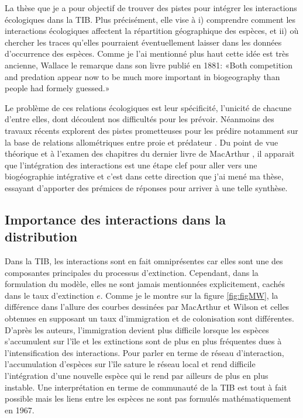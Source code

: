 La thèse que je a pour objectif de trouver des pistes pour intégrer les
interactions écologiques dans la TIB. Plus précisément, elle vise à i)
comprendre comment les interactions écologiques affectent la répartition
géographique des espèces, et ii) où chercher les traces qu'elles
pourraient éventuellement laisser dans les données d'occurrence des
espèces. Comme je l'ai mentionné plus haut cette idée est très ancienne,
Wallace le remarque dans son livre publié en 1881: «Both competition and
predation appear now to be much more important in biogeography than
people had formely guessed.»

Le problème de ces relations écologiques est leur spécificité, l'unicité
de chacune d'entre elles, dont découlent nos difficultés pour les
prévoir. Néanmoins des travaux récents explorent des pistes prometteuses
pour les prédire notamment sur la base de relations allométriques entre
proie et prédateur \citep{Gravel2013}. Du point de vue théorique et à
l'examen des chapitres du dernier livre de MacArthur
\citep{macarthur1972geographical}, il apparait que l'intégration des
interactions est une étape clef pour aller vers une biogéographie
intégrative et c'est dans cette direction que j'ai mené ma thèse,
essayant d'apporter des prémices de réponses pour arriver à une telle
synthèse.

\subsection*{Importance des interactions dans la
distribution}\label{importance-des-interactions-dans-la-distribution}

Dans la TIB, les interactions sont en fait omniprésentes car elles sont
une des composantes principales du processus d'extinction. Cependant,
dans la formulation du modèle, elles ne sont jamais mentionnées
explicitement, cachés dans le taux d'extinction \(e\). Comme je le
montre sur la figure \ref{fig:figMW}, la différence dans l'allure des
courbes dessinées par MacArthur et Wilson et celles obtenues en
supposant un taux d'immigration et de colonisation sont différentes.
D'après les auteurs, l'immigration devient plus difficile lorsque les
espèces s'accumulent sur l'île et les extinctions sont de plus en plus
fréquentes dues à l'intensification des interactions. Pour parler en
terme de réseau d'interaction, l'accumulation d'espèces sur l'île sature
le réseau local et rend difficile l'intégration d'une nouvelle espèce
qui le rend par ailleurs de plus en plus instable. Une interprétation en
terme de communauté de la TIB est tout à fait possible mais les liens
entre les espèces ne sont pas formulés mathématiquement en 1967.

